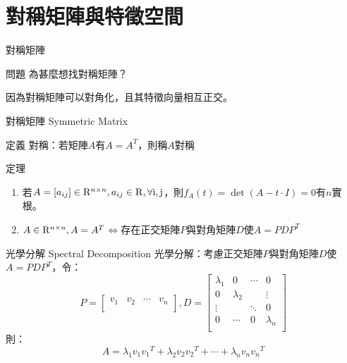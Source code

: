 \documentclass[14pt]{beamer}
\begin{document}
\section{對稱矩陣與特徵空間}
\begin{frame}{對稱矩陣}
	\begin{exampleblock}{問題}
		為甚麼想找對稱矩陣？
	\end{exampleblock}
	因為對稱矩陣可以對角化，且其特徵向量相互正交。
\end{frame}
\begin{frame}{對稱矩陣 Symmetric Matrix}
	\begin{alertblock}{定義}
		對稱：若矩陣$A$有$A={{A}^{T}}$，則稱$A$對稱
	\end{alertblock}
	\begin{exampleblock}{定理}
		\begin{enumerate}
			\item 若$A=\left[ {{a}_{ij}} \right]\in {{\rm{R}}^{n\times n}},{{a}_{ij}}\in \rm{R},\forall i,j$，則${{f}_{A}}(t)=\det (A-t\cdot I)=0$有$n$實根。
			\item $A\in {{\rm{R}}^{n\times n}},A={{A}^{T}}$$\Leftrightarrow $存在正交矩陣$P$與對角矩陣$D$使$A=PD{{P}^{T}}$ 
		\end{enumerate}
	\end{exampleblock}
	
\end{frame}
\begin{frame}{光學分解 Spectral Decomposition}
	光學分解：考慮正交矩陣$P$與對角矩陣$D$使$A=PD{{P}^{T}}$，令：
	\[P=\left[ \begin{matrix}
	{{v}_{1}} & {{v}_{2}} & \cdots  & {{v}_{n}}  \\
	\end{matrix} \right],D=\left[ \begin{matrix}
	{{\lambda }_{1}} & 0 & \cdots  & 0  \\
	0 & {{\lambda }_{2}} & {} & \vdots   \\
	\vdots  & {} & \ddots  & 0  \\
	0 & \cdots  & 0 & {{\lambda }_{n}}  \\
	\end{matrix} \right]\]
	則：
	\[A={{\lambda }_{1}}{{v}_{1}}{{v}_{1}}^{T}+{{\lambda }_{2}}{{v}_{2}}{{v}_{2}}^{T}+\cdots +{{\lambda }_{n}}{{v}_{n}}{{v}_{n}}^{T}\] 
\end{frame}
\end{document}
